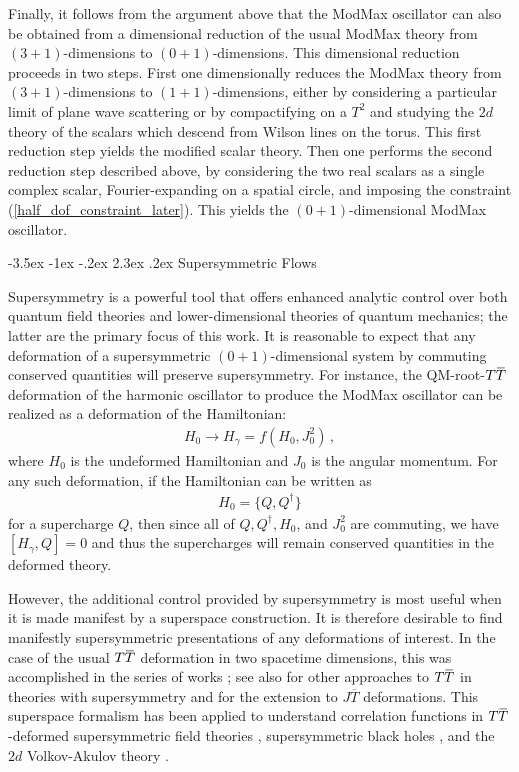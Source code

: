 \documentclass[12pt]{article}
\makeatletter
\numberwithin{equation}{section}
\renewcommand\section{\@startsection {section}{1}{\z@}%
                                   {-3.5ex \@plus -1ex \@minus -.2ex}%
                                   {2.3ex \@plus.2ex}%
                                   {\normalfont\large\bfseries}}
\newcommand{\overbar}[1]{\mkern 1.5mu\overline{\mkern-1.5mu#1\mkern-1.5mu}\mkern 1.5mu}
\def\TT{{T\overbar{T}}}
\makeatother
\begin{document}
Finally, it follows from the argument above that the ModMax oscillator can also be obtained from a dimensional reduction of the usual ModMax theory from $(3+1)$-dimensions to $(0+1)$-dimensions. This dimensional reduction proceeds in two steps. First one dimensionally reduces the ModMax theory from $(3+1)$-dimensions to $(1+1)$-dimensions, either by considering a particular limit of plane wave scattering \cite{Conti:2022egv} or by compactifying on a $T^2$ and studying the $2d$ theory of the scalars which descend from Wilson lines on the torus. This first reduction step yields the modified scalar theory. Then one performs the second reduction step described above, by considering the two real scalars as a single complex scalar, Fourier-expanding on a spatial circle, and imposing the constraint (\ref{half_dof_constraint_later}). This yields the $(0+1)$-dimensional ModMax oscillator.

\section{Supersymmetric Flows}\label{sec:SUSY}

Supersymmetry is a powerful tool that offers enhanced analytic control over both quantum field theories and lower-dimensional theories of quantum mechanics; the latter are the primary focus of this work. It is reasonable to expect that any deformation of a supersymmetric $(0+1)$-dimensional system by commuting conserved quantities will preserve supersymmetry. For instance, the QM-root-$\TT$ deformation of the harmonic oscillator to produce the ModMax oscillator can be realized as a deformation of the Hamiltonian:
%
\begin{align}
    H_0 \longrightarrow H_\gamma = f \left( H_0, J_0^2 \right) \, , 
\end{align}
%
where $H_0$ is the undeformed Hamiltonian and $J_0$ is the angular momentum. For any such deformation, if the Hamiltonian can be written as
%
\begin{align}
    H_0 = \{ Q , Q^\dagger \}
\end{align}
%
for a supercharge $Q$, then since all of $Q, Q^\dagger, H_0$, and $J_0^2$ are commuting, we have $[ H_\gamma, Q ] = 0$ and thus the supercharges will remain conserved quantities in the deformed theory.

However, the additional control provided by supersymmetry is most useful when it is made manifest by a superspace construction. It is therefore desirable to find manifestly supersymmetric presentations of any deformations of interest. In the case of the usual $\TT$ deformation in two spacetime dimensions, this was accomplished in the series of works \cite{Baggio:2018rpv,Chang:2018dge,Jiang:2019hux,Chang:2019kiu,Ferko:2021loo}; see also \cite{Coleman:2019dvf,Lee:2021iut,Lee:2023uxj} for other approaches to $\TT$ in theories with supersymmetry and \cite{Jiang:2019trm} for the extension to $J \overline{T}$ deformations. This superspace formalism has been applied to understand correlation functions in $\TT$-deformed supersymmetric field theories \cite{He:2019ahx,Ebert:2020tuy}, supersymmetric black holes \cite{Manschot:2022lib}, and the $2d$ Volkov-Akulov theory \cite{Cribiori:2019xzp}.
\end{document}
